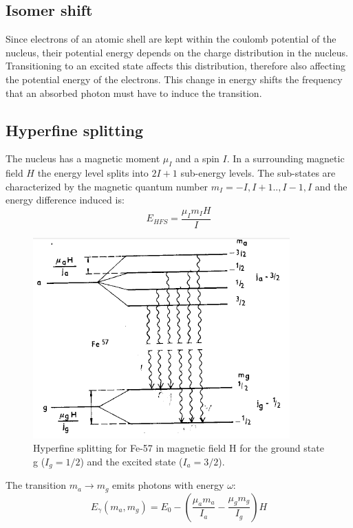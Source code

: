 \subsection{Isomer shift}
Since electrons of an atomic shell are kept within the coulomb potential of the nucleus, their potential energy depends on the charge distribution in the nucleus. Transitioning to an excited state affects this distribution, therefore also affecting the potential energy of the electrons. This change in energy shifts the frequency that an absorbed photon must have to induce the transition\cite{Wegener}.
\subsection{Hyperfine splitting}
The nucleus has a magnetic moment $\mu_I$ and a spin $I$. In a surrounding magnetic field $H$ the energy level splits into $2I+1$ sub-energy levels. The sub-states are characterized by the magnetic quantum number $m_I = -I,I+1..,I-1,I$ and the energy difference induced is:
\begin{equation}
E_{HFS}=\frac{\mu_I m_I H}{I}
\end{equation}
\begin{figure}[H]
\centering
\includegraphics[width=0.5\linewidth]{graphics/HFS}
\caption[Hyperfine splitting Fe-57]{Hyperfine splitting for Fe-57 in magnetic field H for the ground state g ($I_g = 1/2$) and the excited state ($I_a=3/2$). \cite{Wegener}}
\label{fig:HFS}
\end{figure}
The transition $m_a \rightarrow m_g$ emits photons with energy $\omega$:
\begin{equation}
E_\gamma(m_a,m_g) = E_0 - \left( \frac{\mu_a m_a}{I_a}-\frac{\mu_g m_g}{I_g}\right) H
\label{eq:HFS}
\end{equation}


